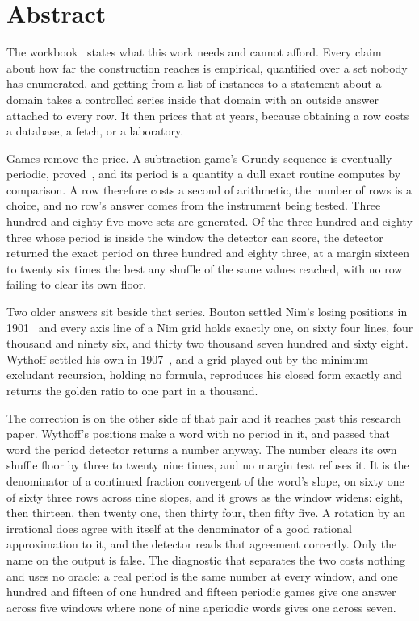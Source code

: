 \chapter*{Abstract}

The workbook~\cite{src:Quigg-orior-workbook} states what this work needs and cannot afford. Every claim about how far the
construction reaches is empirical, quantified over a set nobody has enumerated, and getting from a
list of instances to a statement about a domain takes a controlled series inside that domain with an
outside answer attached to every row. It then prices that at years, because obtaining a row costs a
database, a fetch, or a laboratory.

Games remove the price. A subtraction game's Grundy sequence is eventually periodic, proved~\cite{src:Berlekamp-Conway-and-Guy-1982}, and its
period is a quantity a dull exact routine computes by comparison. A row therefore costs a second of
arithmetic, the number of rows is a choice, and no row's answer comes from the instrument being
tested. Three hundred and eighty five move sets are generated. Of the three hundred and eighty
three whose period is inside the window the detector can score, the detector returned the exact
period on three hundred and eighty three, at a margin sixteen to twenty six times the best any
shuffle of the same values reached, with no row failing to clear its own floor.

Two older answers sit beside that series. Bouton settled Nim's losing positions in 1901~\cite{src:Bouton-1901} and every
axis line of a Nim grid holds exactly one, on sixty four lines, four thousand and ninety six, and
thirty two thousand seven hundred and sixty eight. Wythoff settled his own in 1907~\cite{src:Wythoff-1907}, and a grid
played out by the minimum excludant recursion, holding no formula, reproduces his closed form
exactly and returns the golden ratio to one part in a thousand.

The correction is on the other side of that pair and it reaches past this research paper. Wythoff's positions
make a word with no period in it, and passed that word the period detector returns a number anyway.
The number clears its own shuffle floor by three to twenty nine times, and no margin test refuses it.
It is the denominator of a continued fraction convergent of the word's slope, on sixty one of sixty
three rows across nine slopes, and it grows as the window widens: eight, then thirteen, then twenty
one, then thirty four, then fifty five. A rotation by an irrational does agree with itself at the
denominator of a good rational approximation to it, and the detector reads that agreement correctly.
Only the name on the output is false. The diagnostic that separates the two costs nothing and uses
no oracle: a real period is the same number at every window, and one hundred and fifteen of one
hundred and fifteen periodic games give one answer across five windows where none of nine aperiodic
words gives one across seven.


